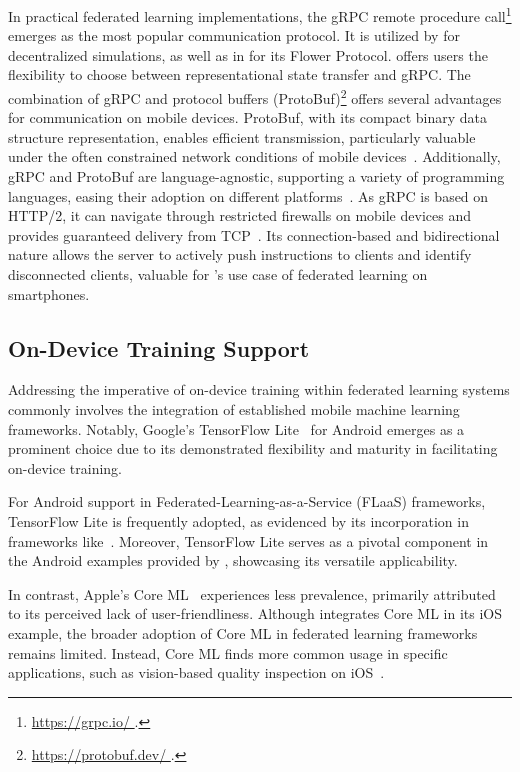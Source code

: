 In practical federated learning implementations,
the gRPC remote procedure call\footnote{\url{
        https://grpc.io/
    }.} emerges as the most popular communication protocol.
It is utilized by \cite{tff,patrick2022openfl} for decentralized simulations,
as well as in \cite{beutel2020flower} for its Flower Protocol.
\cite{madrigal2023project}
offers users the flexibility to choose between representational state transfer
and gRPC. The combination of gRPC and protocol buffers (ProtoBuf)\footnote{\url{
        https://protobuf.dev/
    }.} offers several advantages for communication on mobile devices. ProtoBuf,
with its compact binary data structure representation,
enables efficient transmission,
particularly valuable under the often constrained network conditions of mobile
devices~\cite{popic2016performance}. Additionally,
gRPC and ProtoBuf are language-agnostic,
supporting a variety of programming languages,
easing their adoption on different platforms~\cite{araujo2020performance}.
As gRPC is based on HTTP/2,
it can navigate through restricted firewalls on mobile devices and provides
guaranteed delivery from TCP~\cite{araujo2020performance}.
Its connection-based and bidirectional nature allows the server to actively push
instructions to clients and identify disconnected clients,
valuable for \fedcampus's use case of federated learning on smartphones.

\subsection{On-Device Training Support}

Addressing the imperative of on-device training within federated learning
systems commonly involves the integration of established mobile machine learning
frameworks. Notably,
Google's TensorFlow Lite~\cite{tensorflow2015-whitepaper,abadi2016tensorflow}
for Android emerges as a prominent choice due to its demonstrated flexibility
and maturity in facilitating on-device training.

For Android support in Federated-Learning-as-a-Service (FLaaS) frameworks,
TensorFlow Lite is frequently adopted,
as evidenced by its incorporation in frameworks
like~\cite{kourtellis2020flaas,katevas2022flaas}. Moreover,
TensorFlow Lite serves as a pivotal component in the Android examples provided
by \cite{mathur2021ondevice}, showcasing its versatile applicability.

In contrast, Apple's Core ML~\cite{coreml} experiences less prevalence,
primarily attributed to its perceived lack of user-friendliness.
Although \cite{beutel2020flower} integrates Core ML in its iOS example,
the broader adoption of Core ML in federated learning frameworks remains
limited. Instead, Core ML finds more common usage in specific applications,
such as vision-based quality inspection on iOS~\cite{bharti2022edge}.

